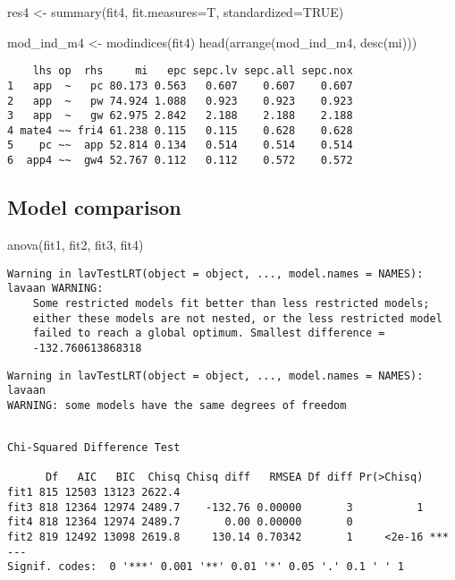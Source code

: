 \documentclass[
  letterpaper,
  DIV=11,
  numbers=noendperiod]{scrartcl}
\newenvironment{Shaded}{\begin{snugshade}}{\end{snugshade}}
\newcommand{\AttributeTok}[1]{\textcolor[rgb]{0.40,0.45,0.13}{#1}}
\newcommand{\ConstantTok}[1]{\textcolor[rgb]{0.56,0.35,0.01}{#1}}
\newcommand{\FunctionTok}[1]{\textcolor[rgb]{0.28,0.35,0.67}{#1}}
\newcommand{\NormalTok}[1]{\textcolor[rgb]{0.00,0.23,0.31}{#1}}
\newcommand{\OtherTok}[1]{\textcolor[rgb]{0.00,0.23,0.31}{#1}}
\begin{document}
\begin{Shaded}
\begin{Highlighting}[]
\NormalTok{res4 }\OtherTok{\textless{}{-}} \FunctionTok{summary}\NormalTok{(fit4, }\AttributeTok{fit.measures=}\NormalTok{T, }\AttributeTok{standardized=}\ConstantTok{TRUE}\NormalTok{)}

\NormalTok{mod\_ind\_m4 }\OtherTok{\textless{}{-}} \FunctionTok{modindices}\NormalTok{(fit4)}
\FunctionTok{head}\NormalTok{(}\FunctionTok{arrange}\NormalTok{(mod\_ind\_m4, }\FunctionTok{desc}\NormalTok{(mi)))}
\end{Highlighting}
\end{Shaded}

\begin{verbatim}
    lhs op  rhs     mi   epc sepc.lv sepc.all sepc.nox
1   app  ~   pc 80.173 0.563   0.607    0.607    0.607
2   app  ~   pw 74.924 1.088   0.923    0.923    0.923
3   app  ~   gw 62.975 2.842   2.188    2.188    2.188
4 mate4 ~~ fri4 61.238 0.115   0.115    0.628    0.628
5    pc ~~  app 52.814 0.134   0.514    0.514    0.514
6  app4 ~~  gw4 52.767 0.112   0.112    0.572    0.572
\end{verbatim}

\subsection{Model comparison}\label{model-comparison}

\begin{Shaded}
\begin{Highlighting}[]
\FunctionTok{anova}\NormalTok{(fit1, fit2, fit3, fit4)}
\end{Highlighting}
\end{Shaded}

\begin{verbatim}
Warning in lavTestLRT(object = object, ..., model.names = NAMES): lavaan WARNING:
    Some restricted models fit better than less restricted models;
    either these models are not nested, or the less restricted model
    failed to reach a global optimum. Smallest difference =
    -132.760613868318
\end{verbatim}

\begin{verbatim}
Warning in lavTestLRT(object = object, ..., model.names = NAMES): lavaan
WARNING: some models have the same degrees of freedom
\end{verbatim}

\begin{verbatim}

Chi-Squared Difference Test

      Df   AIC   BIC  Chisq Chisq diff   RMSEA Df diff Pr(>Chisq)    
fit1 815 12503 13123 2622.4                                          
fit3 818 12364 12974 2489.7    -132.76 0.00000       3          1    
fit4 818 12364 12974 2489.7       0.00 0.00000       0               
fit2 819 12492 13098 2619.8     130.14 0.70342       1     <2e-16 ***
---
Signif. codes:  0 '***' 0.001 '**' 0.01 '*' 0.05 '.' 0.1 ' ' 1
\end{verbatim}
\end{document}
